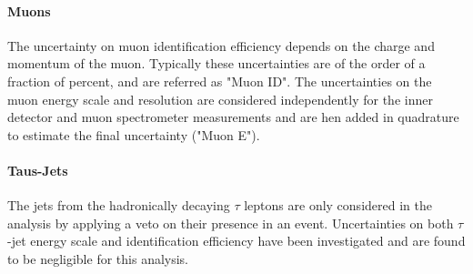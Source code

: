 \paragraph{Muons}
The uncertainty on muon identification efficiency depends on the charge and momentum of the muon.
Typically these uncertainties are of the order of a fraction of percent, and are referred as "Muon ID". 
The uncertainties on the muon energy scale and resolution are considered independently for the inner detector 
and muon spectrometer measurements and are hen  added in quadrature to estimate the final uncertainty ("Muon E").

\paragraph{Taus-Jets}
The jets from the hadronically decaying $\tau$ leptons are only considered 
in the analysis by applying a veto on their presence in an event. Uncertainties on both $\tau$-jet energy scale 
and identification efficiency have been investigated and are found to be negligible for this analysis.

